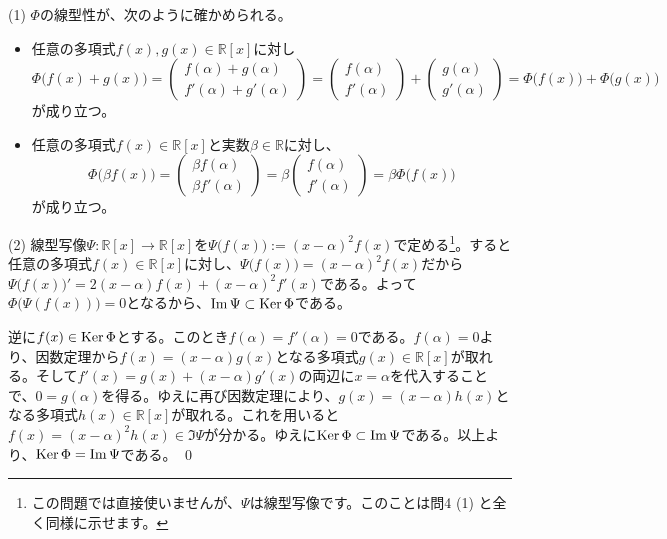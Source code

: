 \noindent (1) $\Phi$の線型性が、次のように確かめられる。
\begin{itemize}
\item 任意の多項式$f(x), g(x) \in \mathbb{R}[x]$に対し
\[
\Phi\bigl(f(x) + g(x)\bigr) = 
\begin{pmatrix}
f(\alpha) + g(\alpha) \\
f'(\alpha) + g'(\alpha)
\end{pmatrix}
=
\begin{pmatrix}
f(\alpha) \\
f'(\alpha)
\end{pmatrix}
+
\begin{pmatrix}
g(\alpha) \\
g'(\alpha)
\end{pmatrix}
= \Phi\bigl(f(x)\bigr) + \Phi\bigl(g(x)\bigr)
\]
が成り立つ。
\item 任意の多項式$f(x) \in \mathbb{R}[x]$と実数$\beta \in \mathbb{R}$に対し、
\[
\Phi\bigl(\beta f(x)\bigr) =
\begin{pmatrix}
\beta f(\alpha) \\
\beta f'(\alpha) 
\end{pmatrix}
=
\beta
\begin{pmatrix}
f(\alpha) \\
f'(\alpha) 
\end{pmatrix}
= \beta\Phi\bigl(f(x)\bigr)
\]
が成り立つ。
\end{itemize}

\noindent (2) 線型写像$\Psi\colon\mathbb{R}[x]\rightarrow\mathbb{R}[x]$を$\Psi\bigl(f(x)\bigr) := (x - \alpha)^2 f(x)$で定める\footnote{この問題では直接使いませんが、$\Psi$は線型写像です。このことは問4 (1) と全く同様に示せます。}。すると任意の多項式$f(x) \in \mathbb{R}[x]$に対し、$\Psi\bigl(f(x)\bigr) = (x - \alpha)^2 f(x)$だから$\Psi\bigl(f(x)\bigr)' = 2(x - \alpha)f(x) + (x - \alpha)^2f'(x)$である。よって$\Phi\bigl(\Psi(f(x))\bigr) = 0$となるから、$\mathrm{Im}\,\Psi \subset \operatorname{Ker}\Phi$である。

逆に$f(x) \in \operatorname{Ker}\Phi$とする。このとき$f(\alpha) = f'(\alpha) = 0$である。$f(\alpha) = 0$より、因数定理から$f(x) = (x - \alpha) g(x)$となる多項式$g(x) \in \mathbb{R}[x]$が取れる。そして$f'(x) = g(x) + (x - \alpha)g'(x)$の両辺に$x = \alpha$を代入することで、$0 = g(\alpha)$を得る。ゆえに再び因数定理により、$g(x) = (x - \alpha)h(x)$となる多項式$h(x)\in\mathbb{R}[x]$が取れる。これを用いると$f(x) = (x - \alpha)^2 h(x) \in \Im\Psi$が分かる。ゆえに$\operatorname{Ker} \Phi \subset \mathrm{Im}\, \Psi$である。以上より、$\operatorname{Ker}\Phi = \mathrm{Im}\, \Psi$である。 \qed


